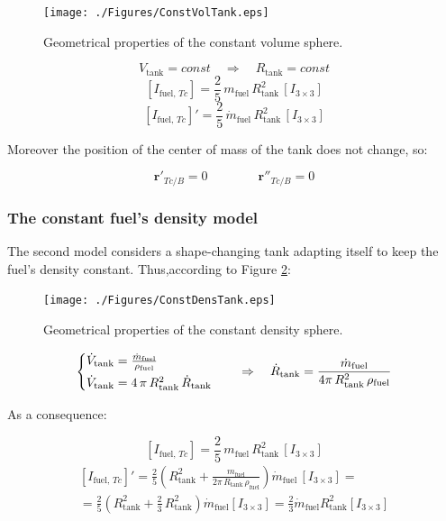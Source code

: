 \begin{figure}[h!]
	\centering
	\texttt{[image: ./Figures/ConstVolTank.eps]}
	\caption{Geometrical properties of the constant volume sphere.}
	\label{fig:CostTankVol}
\end{figure}

\begin{equation}
	V_{\text{tank}}= const \quad \Rightarrow \quad R_{\text{tank}} = const
\end{equation}
\begin{equation}
	\left[I_{\text{fuel, }Tc}\right] = \frac{2}{5}\,m_{\text{fuel}} \,R_{\text{tank}}^2\, \left[I_{3\times3}\right]
\end{equation} 
\begin{equation}
	\left[I_{\text{fuel, }Tc}\right]' = \frac{2}{5}\,\dot{m}_{\text{fuel}} \,R_{\text{tank}}^2\, \left[I_{3\times3}\right]
\end{equation}

Moreover the position of the center of mass of the tank does not change, so:

\begin{equation}
	\bm{r}'_{Tc/B} = 0 \qquad\qquad \bm{r}''_{Tc/B}=0
\end{equation}
\subsubsection{The constant fuel's density model}
The second model considers a shape-changing tank adapting itself to keep the fuel's density constant. Thus,according to Figure \ref{fig:ConstDensTank}:
\begin{figure}[hb!]
	\centering
	\texttt{[image: ./Figures/ConstDensTank.eps]}
	\caption{Geometrical properties of the constant density sphere.}
	\label{fig:ConstDensTank}
\end{figure}
\begin{equation}
	\begin{cases}
		\dot{V}_{\text{tank}} = \frac{\dot{m}_{\text{fuel}}}{\rho_{\text{fuel}}} \vspace{3pt}\\
		\dot{V}_{\text{tank}} = 4\,\pi\,R_{\text{tank}}^2\,\dot{R}_{\text{tank}}
	\end{cases}
	\quad \Rightarrow \quad \dot{R}_{\text{tank}} = \frac{\dot{m}_{\text{fuel}}}{4\pi\,R_{\text{tank}}^2\,\rho_{\text{fuel}}}
\end{equation}

As a consequence:

\begin{equation}
	\left[I_{\text{fuel, }Tc}\right]= \frac{2}{5}\,m_{\text{fuel}} \,R_{\text{tank}}^2\, \left[I_{3\times3}\right]
\end{equation}
\begin{multline}
	\left[I_{\text{fuel, }Tc}\right]' =  \frac{2}{5}\left(R^2_{\text{tank}}+\frac{m_{\text{fuel}}}{2\pi\,R_{\text{tank}}\,\rho_{\text{fuel}}}\right)\dot{m}_{\text{fuel}}\,\left[I_{3\times3} \right] =\\
	= \frac{2}{5}\left(R^2_{\text{tank}} + \frac{2}{3}\,R^2_{\text{tank}}\right)\dot{m}_{\text{fuel}}\left[I_{3\times3}\right] = \frac{2}{3}\dot{m}_{\text{fuel}}R^2_{\text{tank}}\left[I_{3\times3}\right]
\end{multline}

